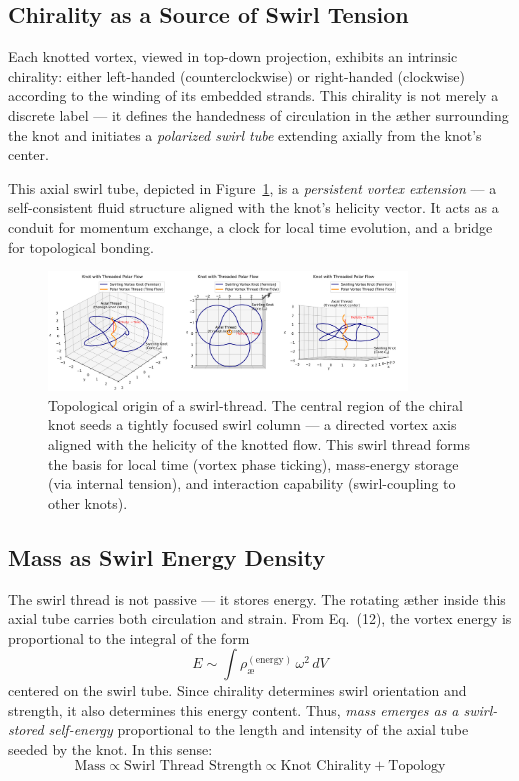 \documentclass[a4paper,12pt]{article}
\begin{document}
    \subsection{Chirality as a Source of Swirl Tension}

    Each knotted vortex, viewed in top-down projection, exhibits an intrinsic chirality: either left-handed (counterclockwise) or right-handed (clockwise) according to the winding of its embedded strands. This chirality is not merely a discrete label — it defines the handedness of circulation in the æther surrounding the knot and initiates a \textit{polarized swirl tube} extending axially from the knot’s center.

    This axial swirl tube, depicted in Figure~\ref{fig:knotthreaded}, is a \textit{persistent vortex extension} — a self-consistent fluid structure aligned with the knot’s helicity vector. It acts as a conduit for momentum exchange, a clock for local time evolution, and a bridge for topological bonding.

    \begin{figure}[H]
        \centering
        \includegraphics[width=0.85\textwidth]{KnotThreadedPolarFlow}
        \caption{Topological origin of a swirl-thread. The central region of the chiral knot seeds a tightly focused swirl column — a directed vortex axis aligned with the helicity of the knotted flow. This swirl thread forms the basis for local time (vortex phase ticking), mass-energy storage (via internal tension), and interaction capability (swirl-coupling to other knots).}
        \label{fig:knotthreaded}
    \end{figure}

    \subsection{Mass as Swirl Energy Density}

    The swirl thread is not passive — it stores energy. The rotating æther inside this axial tube carries both circulation and strain. From Eq.~(12), the vortex energy is proportional to the integral of the form
    \[
        E \sim \int \rho_{\text{\ae}}^{(\text{energy})} \, \omega^2 \, dV
    \]
    centered on the swirl tube. Since chirality determines swirl orientation and strength, it also determines this energy content. Thus, \textit{mass emerges as a swirl-stored self-energy} proportional to the length and intensity of the axial tube seeded by the knot. In this sense:
    \[
        \text{Mass} \propto \text{Swirl Thread Strength} \propto \text{Knot Chirality} + \text{Topology}
    \]
\end{document}
